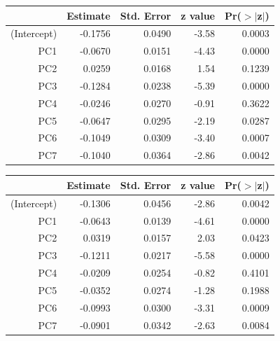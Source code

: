 \documentclass[a4paper,12pt]{Latex/Classes/PhDthesisPSnPDF}
\begin{document}
\begin{center}
\begin{table}[ht]
\centering
\begin{tabular}{rrrrr}
  \hline
 & Estimate & Std. Error & z value & Pr($>$$|$z$|$) \\ 
  \hline
(Intercept) & -0.1756 & 0.0490 & -3.58 & 0.0003 \\ 
  PC1 & -0.0670 & 0.0151 & -4.43 & 0.0000 \\ 
  PC2 & 0.0259 & 0.0168 & 1.54 & 0.1239 \\ 
  PC3 & -0.1284 & 0.0238 & -5.39 & 0.0000 \\ 
  PC4 & -0.0246 & 0.0270 & -0.91 & 0.3622 \\ 
  PC5 & -0.0647 & 0.0295 & -2.19 & 0.0287 \\ 
  PC6 & -0.1049 & 0.0309 & -3.40 & 0.0007 \\ 
  PC7 & -0.1040 & 0.0364 & -2.86 & 0.0042 \\ 
   \hline
\end{tabular}
\end{table}\end{center}

\begin{center}
\begin{table}[ht]
\centering
\begin{tabular}{rrrrr}
  \hline
 & Estimate & Std. Error & z value & Pr($>$$|$z$|$) \\ 
  \hline
(Intercept) & -0.1306 & 0.0456 & -2.86 & 0.0042 \\ 
  PC1 & -0.0643 & 0.0139 & -4.61 & 0.0000 \\ 
  PC2 & 0.0319 & 0.0157 & 2.03 & 0.0423 \\ 
  PC3 & -0.1211 & 0.0217 & -5.58 & 0.0000 \\ 
  PC4 & -0.0209 & 0.0254 & -0.82 & 0.4101 \\ 
  PC5 & -0.0352 & 0.0274 & -1.28 & 0.1988 \\ 
  PC6 & -0.0993 & 0.0300 & -3.31 & 0.0009 \\ 
  PC7 & -0.0901 & 0.0342 & -2.63 & 0.0084 \\ 
   \hline
\end{tabular}
\end{table}\end{center}
\end{document}
